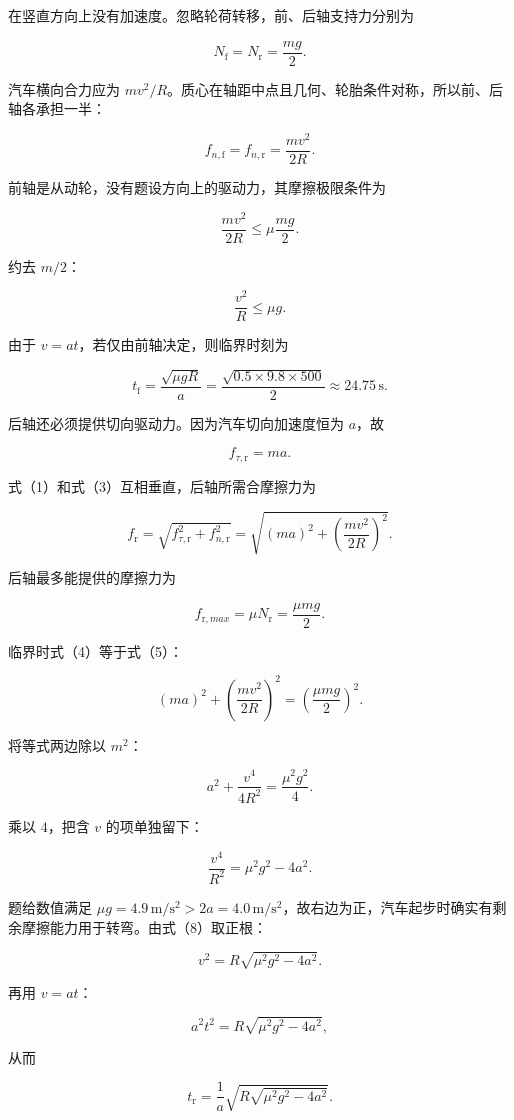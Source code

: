 \documentclass[12pt,a4paper,UTF8]{ctexart}
\begin{document}
在竖直方向上没有加速度。忽略轮荷转移，前、后轴支持力分别为

\[
N_{\mathrm f}=N_{\mathrm r}=\frac{mg}{2}.
\]

汽车横向合力应为
\(mv^2/R\)。质心在轴距中点且几何、轮胎条件对称，所以前、后轴各承担一半：

\[
f_{n,\mathrm f}=f_{n,\mathrm r}=\frac{mv^2}{2R}. \tag{1}
\]

前轴是从动轮，没有题设方向上的驱动力，其摩擦极限条件为

\[
\frac{mv^2}{2R}\leq \mu\frac{mg}{2}.
\]

约去 \(m/2\)：

\[
\frac{v^2}{R}\leq\mu g.
\]

由于 \(v=at\)，若仅由前轴决定，则临界时刻为

\[
t_{\mathrm f}=\frac{\sqrt{\mu gR}}{a}
=\frac{\sqrt{0.5\times9.8\times500}}{2}
\approx24.75\,\mathrm s. \tag{2}
\]

后轴还必须提供切向驱动力。因为汽车切向加速度恒为 \(a\)，故

\[
f_{\tau,\mathrm r}=ma. \tag{3}
\]

式（1）和式（3）互相垂直，后轴所需合摩擦力为

\[
f_{\mathrm r}
=\sqrt{f_{\tau,\mathrm r}^2+f_{n,\mathrm r}^2}
=\sqrt{(ma)^2+\left(\frac{mv^2}{2R}\right)^2}. \tag{4}
\]

后轴最多能提供的摩擦力为

\[
f_{\mathrm r,max}=\mu N_{\mathrm r}=\frac{\mu mg}{2}. \tag{5}
\]

临界时式（4）等于式（5）：

\[
(ma)^2+\left(\frac{mv^2}{2R}\right)^2
=\left(\frac{\mu mg}{2}\right)^2. \tag{6}
\]

将等式两边除以 \(m^2\)：

\[
a^2+\frac{v^4}{4R^2}=\frac{\mu^2g^2}{4}. \tag{7}
\]

乘以 \(4\)，把含 \(v\) 的项单独留下：

\[
\frac{v^4}{R^2}=\mu^2g^2-4a^2. \tag{8}
\]

题给数值满足
\(\mu g=4.9\,\mathrm{m/s^2}>2a=4.0\,\mathrm{m/s^2}\)，故右边为正，汽车起步时确实有剩余摩擦能力用于转弯。由式（8）取正根：

\[
v^2=R\sqrt{\mu^2g^2-4a^2}. \tag{9}
\]

再用 \(v=at\)：

\[
a^2t^2=R\sqrt{\mu^2g^2-4a^2},
\]

从而

\[
t_{\mathrm r}
=\frac1a\sqrt{R\sqrt{\mu^2g^2-4a^2}}. \tag{10}
\]
\end{document}
